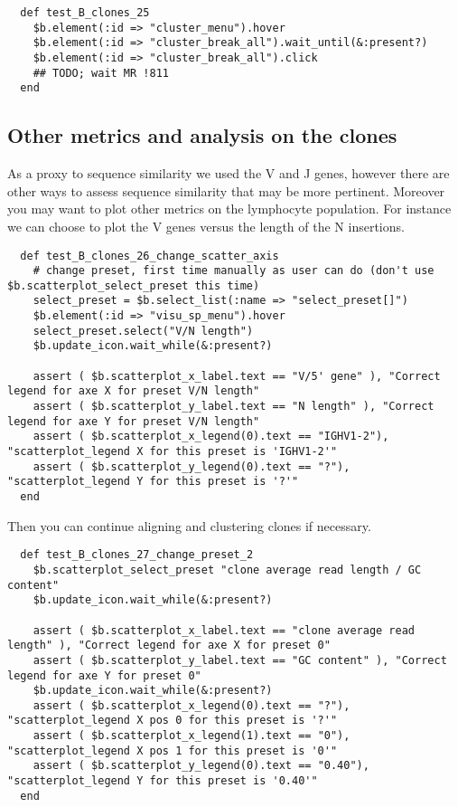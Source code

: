 \begin{verbatim}
  def test_B_clones_25
    $b.element(:id => "cluster_menu").hover
    $b.element(:id => "cluster_break_all").wait_until(&:present?)
    $b.element(:id => "cluster_break_all").click
    ## TODO; wait MR !811
  end
\end{verbatim}

\subsection{Other metrics and analysis on the clones}

As a proxy to sequence similarity we used the V and J genes, however there are
other ways to assess sequence similarity that may be more pertinent.
Moreover you may want to plot other metrics on the lymphocyte population.
%
For instance we can choose to plot the V genes versus the length of the N
insertions.
\begin{verbatim}
  def test_B_clones_26_change_scatter_axis
    # change preset, first time manually as user can do (don't use $b.scatterplot_select_preset this time) 
    select_preset = $b.select_list(:name => "select_preset[]")
    $b.element(:id => "visu_sp_menu").hover
    select_preset.select("V/N length")
    $b.update_icon.wait_while(&:present?)

    assert ( $b.scatterplot_x_label.text == "V/5' gene" ), "Correct legend for axe X for preset V/N length"
    assert ( $b.scatterplot_y_label.text == "N length" ), "Correct legend for axe Y for preset V/N length"
    assert ( $b.scatterplot_x_legend(0).text == "IGHV1-2"), "scatterplot_legend X for this preset is 'IGHV1-2'"
    assert ( $b.scatterplot_y_legend(0).text == "?"), "scatterplot_legend Y for this preset is '?'"
  end
\end{verbatim}

Then you can continue aligning and clustering clones if necessary.

\begin{verbatim}
  def test_B_clones_27_change_preset_2
    $b.scatterplot_select_preset "clone average read length / GC content"
    $b.update_icon.wait_while(&:present?)

    assert ( $b.scatterplot_x_label.text == "clone average read length" ), "Correct legend for axe X for preset 0"
    assert ( $b.scatterplot_y_label.text == "GC content" ), "Correct legend for axe Y for preset 0"
    $b.update_icon.wait_while(&:present?)
    assert ( $b.scatterplot_x_legend(0).text == "?"), "scatterplot_legend X pos 0 for this preset is '?'"
    assert ( $b.scatterplot_x_legend(1).text == "0"), "scatterplot_legend X pos 1 for this preset is '0'"
    assert ( $b.scatterplot_y_legend(0).text == "0.40"), "scatterplot_legend Y for this preset is '0.40'"
  end
\end{verbatim}

